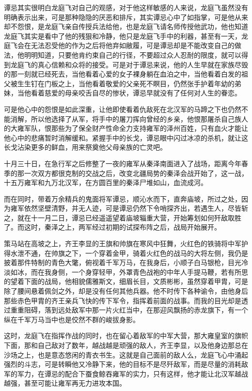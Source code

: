 谭忌其实很明白龙庭飞对自己的观感，对于他这样敏感的人来说，龙庭飞虽然没有明确表示出来，可是那种隐隐的厌恶和排斥，其实谭忌心中了如指掌，可是他从来却不怨恨，是龙庭飞亲自传授兵法给他，也是龙庭飞请名师传授他武功，他也知道龙庭飞其实是看中了他的残狠和冷静，他只是龙庭飞手中的利器，甚至有一天，龙庭飞会在无法忍受他的作为之后将他弃如敝履，可是谭忌却是不能改变自己的做法，他明明知道，只要他肯约束自己的行径，不要超过众人忍耐的限度，就可以得到龙庭飞的真心信赖和众将的接受。可是对于谭忌来说，他的人生早就在家族尽毁的那一刻就已经死去，当他看着心爱的女子裸身躺在血泊之中，当他看着白发的祖父被生生钉在门板之上，当他看着敬爱的父亲死不瞑目，仍然张手护着年幼的弟妹，当他看着慈爱的母亲咬舌自尽的惨状，谭忌早就没有了任何对人生的眷恋。

可是他心中的怨恨是如此深重，让他即使看着仇敌死在北汉军的马蹄之下也仍然不能消解，所以他选择了从军，将手中的屠刀挥向曾经的乡亲，他恨那屠杀自己族人的大雍军队，恨那些为了保全财产性命全力支持雍军的泽州百姓，只有血火才能让他心中的悲痛暂时消解缓和。紧握手中的长戈，谭忌眼中闪过冰凉的杀机，就让这长戈沾染更多的鲜血，用来祭奠他父母亲族的亡灵吧。

十月三十日，在急行军之后修整了一夜的雍军从秦泽南面进入了战场，距离今年春季的那一次双方都很克制的交战之后，改变北疆局势的秦泽会战开始了，这一战，十五万雍军和九万北汉军，在方圆百里的秦泽尸堆如山，血流成河。

而在同时，带着万余精兵的鬼面将军谭忌，顺沁水而下，直奔庙坡，所过之处，因为雍军依然坚壁清野，并无人迹，可是谭忌仍然下令哨探齐出，若遇生人，尽皆斩之，就在十一月二日，谭忌已经遥遥望着庙坡辎重大营，开始筹划如何歼敌取胜了。而这时，秦泽之上，两军经过初期的试探布阵之后，战局开始展开。

策马站在高坡之上，齐王李显的王旗和帅旗在寒风中狂舞，火红色的铁骑将中军护得水泄不通，在帅旗之下，一个穿着金甲，骑着火红色的战马的大将左侧，我仍是披着那件特制的青色大氅，俯视着千军万马，在我身后，小顺子白马银枪，目光冷淡如冰，而在我身侧，一个身穿轻甲，外罩青色战袍的中年人手提马鞭，若有所思的望着下面的战局，他相貌儒雅斯文，细眉长目，文质彬彬，虽然穿着甲胄，可是除了腰间悬着佩剑之外，却是没有任何其他兵器。他不时传下各种谕令，由他身后那些赤色甲胄的齐王亲兵飞快的传下军令，指挥着前面的战事。而我的目光却是透过重重阻碍，落到远处敌军中那一片火红当中，在那迎风飘扬的赤龙旗下，有一个纵在千军万马当中也是佼然不群的峻拔身影。

这时，龙庭飞在指挥作战的同时，也在留心着敌军的中军大营，那大雍皇室的旗帜下面，那和自己敌对了数年，越战越是顽强的敌人，齐王李显，以及他身边那总在沙场之上，也是意态悠闲的青衣书生。这就是自己面前的敌人么，龙庭飞心中涌起强烈的斗志，可是转瞬他又冷静下来，他的目标不是尽歼敌军，而是尽量的消耗敌军的军力，在谭忌的配合下蚕食鲸吞雍军的实力，只有这样，他才能让北汉军越战越强，甚至可能让雍军再无力进攻本国。

